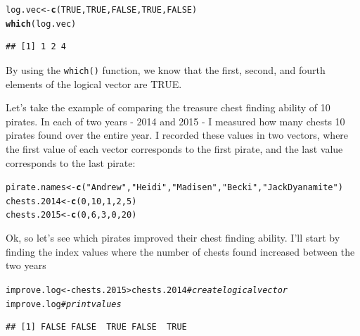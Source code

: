 \documentclass{tufte-book}\usepackage[]{graphicx}\usepackage[]{color}
\makeatletter
\newcommand{\hlnum}[1]{\textcolor[rgb]{0.686,0.059,0.569}{#1}}%
\newcommand{\hlstr}[1]{\textcolor[rgb]{0.192,0.494,0.8}{#1}}%
\newcommand{\hlcom}[1]{\textcolor[rgb]{0.678,0.584,0.686}{\textit{#1}}}%
\newcommand{\hlopt}[1]{\textcolor[rgb]{0,0,0}{#1}}%
\newcommand{\hlstd}[1]{\textcolor[rgb]{0.345,0.345,0.345}{#1}}%
\newcommand{\hlkwb}[1]{\textcolor[rgb]{0.69,0.353,0.396}{#1}}%
\newcommand{\hlkwd}[1]{\textcolor[rgb]{0.737,0.353,0.396}{\textbf{#1}}}%
\newenvironment{kframe}{%
 \def\at@end@of@kframe{}%
 \ifinner\ifhmode%
  \def\at@end@of@kframe{\end{minipage}}%
  \begin{minipage}{\columnwidth}%
 \fi\fi%
 \def\FrameCommand##1{\hskip\@totalleftmargin \hskip-\fboxsep
 \colorbox{shadecolor}{##1}\hskip-\fboxsep
     \hskip-\linewidth \hskip-\@totalleftmargin \hskip\columnwidth}%
 \MakeFramed {\advance\hsize-\width
   \@totalleftmargin\z@ \linewidth\hsize
   \@setminipage}}%
 {\par\unskip\endMakeFramed%
 \at@end@of@kframe}
\newenvironment{knitrout}{}{} %
\makeatother
\begin{document}
\begin{knitrout}
\color{fgcolor}\begin{kframe}
\begin{alltt}
\hlstd{log.vec} \hlkwb{<-} \hlkwd{c}\hlstd{(}\hlnum{TRUE}\hlstd{,} \hlnum{TRUE}\hlstd{,} \hlnum{FALSE}\hlstd{,} \hlnum{TRUE}\hlstd{,} \hlnum{FALSE}\hlstd{)}
\hlkwd{which}\hlstd{(log.vec)}
\end{alltt}
\begin{verbatim}
## [1] 1 2 4
\end{verbatim}
\end{kframe}
\end{knitrout}

By using the \texttt{which()} function, we know that the first, second, and fourth elements of the logical vector are TRUE.

Let's take the example of comparing the treasure chest finding ability of 10 pirates. In each of two years - 2014 and 2015 - I measured how many chests 10 pirates found over the entire year. I recorded these values in two vectors, where the first value of each vector corresponds to the first pirate, and the last value corresponds to the last pirate:


\begin{knitrout}
\color{fgcolor}\begin{kframe}
\begin{alltt}
\hlstd{pirate.names} \hlkwb{<-} \hlkwd{c}\hlstd{(}\hlstr{"Andrew"}\hlstd{,} \hlstr{"Heidi"}\hlstd{,} \hlstr{"Madisen"}\hlstd{,} \hlstr{"Becki"}\hlstd{,} \hlstr{"Jack Dyanamite"}\hlstd{)}
\hlstd{chests.2014} \hlkwb{<-} \hlkwd{c}\hlstd{(}\hlnum{0}\hlstd{,} \hlnum{10}\hlstd{,} \hlnum{1}\hlstd{,} \hlnum{2}\hlstd{,} \hlnum{5}\hlstd{)}
\hlstd{chests.2015} \hlkwb{<-} \hlkwd{c}\hlstd{(}\hlnum{0}\hlstd{,} \hlnum{6}\hlstd{,} \hlnum{3}\hlstd{,} \hlnum{0}\hlstd{,} \hlnum{20}\hlstd{)}
\end{alltt}
\end{kframe}
\end{knitrout}


Ok, so let's see which pirates improved their chest finding ability. I'll start by finding the index values where the number of chests found increased between the two years


\begin{knitrout}
\color{fgcolor}\begin{kframe}
\begin{alltt}
\hlstd{improve.log} \hlkwb{<-} \hlstd{chests.2015} \hlopt{>} \hlstd{chests.2014} \hlcom{# create logical vector}
\hlstd{improve.log} \hlcom{# print values}
\end{alltt}
\begin{verbatim}
## [1] FALSE FALSE  TRUE FALSE  TRUE
\end{verbatim}
\end{kframe}
\end{knitrout}
\end{document}
